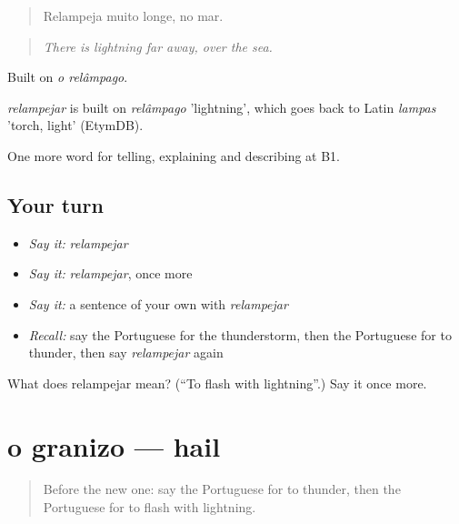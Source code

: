 \begin{quote}
Relampeja muito longe, no mar.
\end{quote}

\begin{quote}
\emph{There is lightning far away, over the sea.}
\end{quote}

Built on \emph{o relâmpago}.

\begin{cousinweb}
\emph{relampejar} is built on \emph{relâmpago} 'lightning', which goes back to Latin \emph{lampas} 'torch, light' (EtymDB).
\end{cousinweb}

\begin{grammarlens}[title={What you've built}]
One more word for telling, explaining and describing at B1.
\end{grammarlens}

\subsection*{Your turn}
\begin{itemize}
\raggedright
  \item \emph{Say it:} \emph{relampejar}
  \item \emph{Say it:} \emph{relampejar}, once more
  \item \emph{Say it:} a sentence of your own with \emph{relampejar}
  \item \emph{Recall:} say the Portuguese for the thunderstorm, then the Portuguese for to thunder, then say \emph{relampejar} again
\end{itemize}

\begin{tcolorbox}[breakable,colback=teal!4,colframe=teal!35!black,title={Before you move on}]
What does relampejar mean? (\textquotedblleft{}To flash with lightning\textquotedblright{}.) Say it once more.
\end{tcolorbox}
\section[o granizo]{o granizo — hail}

\label{lesson:PT-C463-granizo}



\begin{quote}
Before the new one: say the Portuguese for to thunder, then the Portuguese for to flash with lightning.
\end{quote}

